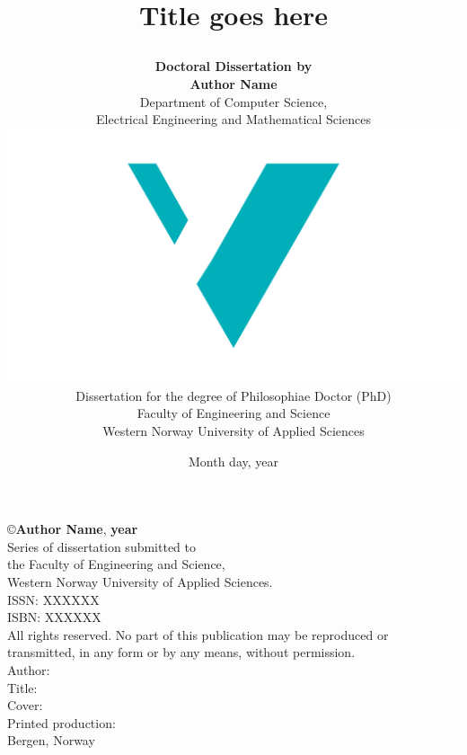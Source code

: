 \documentclass[12pt]{book} %
\title{
{\fontsize{28}{30}\bfseries Title goes here}
	\author{
        \textbf{Doctoral Dissertation by} \\ \textbf{Author Name}\vspace{1cm}\\
		Department of Computer Science, \\ 
		Electrical Engineering and Mathematical Sciences \vspace{1cm}\\
		\includegraphics[scale=0.36]{logos/logo.pdf}\vspace{2em}\\
		Dissertation for the degree of Philosophiae Doctor (PhD)\vspace{0.5em}\\
		Faculty of Engineering and Science \vspace{0.3cm}\\
		Western Norway University of Applied Sciences
	}
	\date{Month day, year}
}
\begin{document}

\newcommand{\TextSize}{13}
\newcommand{\BaseLineSkip}{15}
\fontsize{\TextSize}{\BaseLineSkip}
\selectfont

\maketitle
\thispagestyle{empty}

\normalsize\vspace*{12cm}
\begin{minipage}{13cm}
\copyright{\textbf{Author Name}}, \textbf{year}\\[5ex] %
Series of dissertation submitted to\\
the Faculty of Engineering and Science,\\
Western Norway University of Applied Sciences.\\[3ex]
ISSN: XXXXXX\\ %
ISBN: XXXXXX\\[3ex] %
All rights reserved. No part of this publication may be reproduced or
transmitted, in any form or by any means, without permission.\\[3ex]

Author: \\
Title: \\[5ex]

Cover: \\
Printed production: \\[3ex]
Bergen, Norway
\end{minipage}



\frontmatter



\tableofcontents
\end{document}
